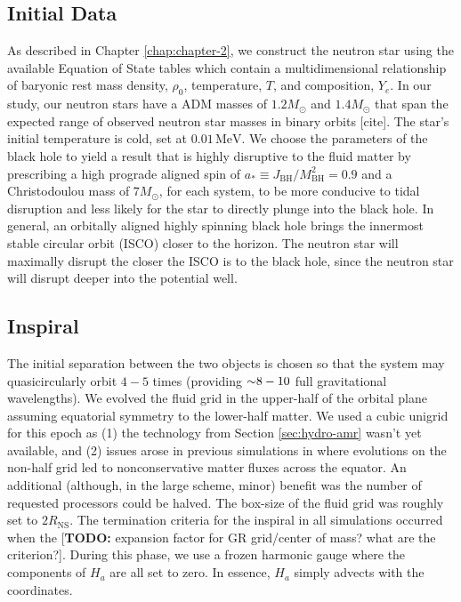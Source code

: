 \subsection{Initial Data} As described in Chapter \ref{chap:chapter-2}, we construct the neutron star using the available Equation of State tables which contain a multidimensional relationship of baryonic rest mass density, $\rho_0$, temperature, $T$, and composition, $Y_e$.  In our study, our neutron stars have a ADM masses of $1.2 M_\odot$ and $1.4 M_\odot$ that span the expected range of observed neutron star masses in binary orbits [cite].  The star's initial temperature is cold, set at $0.01\,\textrm{MeV}$.  We choose the parameters of the black hole to yield a result that is highly disruptive to the fluid matter by prescribing a high prograde aligned spin of $a_* \equiv J_\textrm{BH}/M_\textrm{BH}^2 = 0.9$ and a Christodoulou mass of $7 M_\odot$, for each system, to be more conducive to tidal disruption and less likely for the star to directly plunge into the black hole.
In general, an orbitally aligned highly spinning black hole brings the innermost stable circular orbit (ISCO) closer to the horizon.
The neutron star will maximally disrupt the closer the ISCO is to the black hole, since the  neutron star will disrupt deeper into the potential well.



\subsection{Inspiral}
The initial separation between the two objects is chosen so that the system may quasicircularly orbit $4-5$ times (providing $\mathord{\sim} 8-10$ full gravitational wavelengths).  
We evolved the fluid grid in the upper-half of the orbital plane assuming equatorial symmetry to the lower-half matter.  We used a cubic unigrid for this epoch as (1) the technology from Section \ref{sec:hydro-amr} wasn't yet available, and (2) issues arose in previous simulations in \SpEC where evolutions on the non-half grid led to nonconservative matter fluxes across the equator.  
An additional (although, in the large scheme, minor) benefit was the number of requested processors could be halved.  
The box-size of the fluid grid was roughly set to $2 R_\textrm{NS}$.  
The termination criteria for the inspiral in all simulations occurred when the [\textbf{TODO:} expansion factor for GR grid/center of mass?  what are the criterion?].  
During this phase, we use a frozen harmonic gauge where the components of $H_a$ are all set to zero.  
In essence, $H_a$ simply advects with the coordinates.
	
